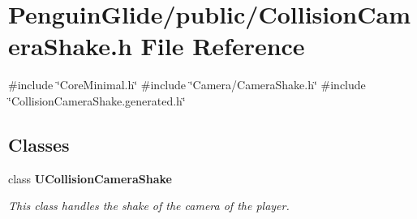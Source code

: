 \section{Penguin\+Glide/public/\+Collision\+Camera\+Shake.h File Reference}
\label{_collision_camera_shake_8h}
{\ttfamily \#include \char`\"{}Core\+Minimal.\+h\char`\"{}}\newline
{\ttfamily \#include \char`\"{}Camera/\+Camera\+Shake.\+h\char`\"{}}\newline
{\ttfamily \#include \char`\"{}Collision\+Camera\+Shake.\+generated.\+h\char`\"{}}\newline
\subsection*{Classes}
\begin{DoxyCompactItemize}
\item 
class \textbf{ U\+Collision\+Camera\+Shake}
\begin{DoxyCompactList}\small\item\em This class handles the shake of the camera of the player. \end{DoxyCompactList}\end{DoxyCompactItemize}
